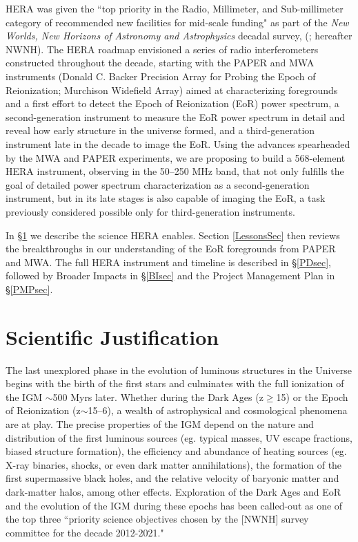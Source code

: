 \documentclass[preprint]{aastex}
\begin{document}
HERA was given the ``top priority in the Radio, Millimeter, and Sub-millimeter category of recommended new facilities for mid-scale funding" as part of the {\it New Worlds, New Horizons of Astronomy and Astrophysics} decadal survey, (\citealt{astro2010}; hereafter NWNH).  The HERA roadmap envisioned a series of radio interferometers constructed throughout the decade, starting with the PAPER and MWA instruments (Donald C. Backer Precision Array for Probing the Epoch of Reionization; Murchison Widefield Array) aimed at characterizing foregrounds and a first effort to detect the Epoch of Reionization (EoR) power spectrum, a second-generation instrument to measure the EoR power spectrum in detail and reveal how early structure in the universe formed, and a third-generation instrument late in the decade to image the EoR. Using the advances spearheaded by the MWA and PAPER experiments, we are proposing to build a 568-element HERA instrument, observing in the 50--250 MHz band, that not only fulfills the goal of detailed power spectrum characterization as a second-generation instrument, but in its late stages is also capable of imaging the EoR, a task previously considered possible only for third-generation instruments.

In \S \ref{SJsec} we describe the science HERA enables. Section \ref{LessonsSec} then reviews the breakthroughs in our understanding of the EoR foregrounds from PAPER and MWA. The full HERA instrument and timeline is described in \S \ref{PDsec}, followed by Broader Impacts in \S \ref{BIsec} and the Project Management Plan in \S \ref{PMPsec}.

\vspace{-0.25in}
\section{Scientific Justification}
\label{SJsec}

The last unexplored phase in the evolution of luminous structures in the
Universe begins with the birth of the first stars and culminates with
the full ionization of the IGM $\sim$500 Myrs later.  Whether during the Dark Ages (z$\ge$15) or the Epoch of Reionization
(z$\sim$15--6), a wealth of astrophysical and cosmological phenomena are at
play.  The precise properties of the IGM depend on the nature and distribution
of the first luminous sources (eg. typical masses, UV escape fractions, biased
structure formation), the efficiency and abundance of heating sources (eg.
X-ray binaries, shocks, or even dark matter annihilations), the formation of
the first supermassive black holes, and the relative velocity of baryonic
matter and dark-matter halos, among other effects.  Exploration of the Dark
Ages and EoR and the evolution of
the IGM during these epochs has been called-out as one of the top three
``priority science objectives chosen by the [NWNH] survey committee for the
decade 2012-2021."
\end{document}
